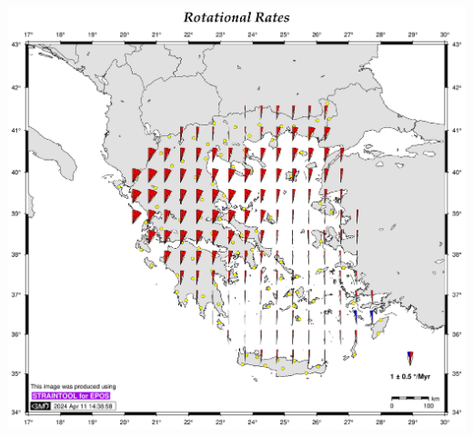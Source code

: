 \documentclass[landscape,a0paper,fontscale=0.346]{baposter} %
\begin{document}
\begin{poster}
{\begin{minipage}[c]{0.33\linewidth}
  \includegraphics[width=.97\textwidth]{hepos22-output_rot.jpg}
\end{minipage}




}
\end{poster}
\end{document}
